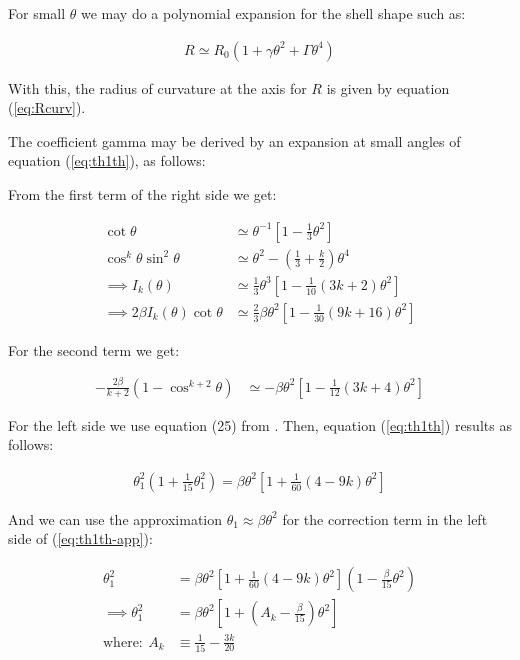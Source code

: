 For small $\theta$ we may do a polynomial expansion for the shell shape such as:

\begin{align}
R \simeq R_0\left(1+\gamma\theta^2 + \Gamma\theta^4\right) \label{eq:R-exp}
\end{align}

With this, the radius of curvature at the axis for $R$ is given by equation (\ref{eq:Rcurv}).

The coefficient gamma may be derived by an expansion at small angles of equation
(\ref{eq:th1th}), as follows:

From the first term of the right side we get:

\begin{align}
\cot\theta &\simeq \theta^{-1}\left[1-\frac{1}{3}\theta^2\right] \\
\cos^k\theta\sin^2\theta &\simeq \theta^2 - \left(\frac{1}{3} + \frac{k}{2}\right)\theta^4 \\
\implies I_k(\theta) &\simeq \frac{1}{3}\theta^3\left[ 1 - \frac{1}{10}(3k+2)\theta^2\right]\\
\implies 2\beta I_k(\theta)\cot\theta &\simeq \frac{2}{3}\beta\theta^2\left[1-\frac{1}{30}
(9k+16)\theta^2\right]\label{eq:AR1} 
\end{align}

For the second term we get:

\begin{align}
-\frac{2\beta}{k+2}\left(1-\cos^{k+2}\theta\right) & \simeq -\beta\theta^2\left[1-\frac{1}{12}
(3k+4)\theta^2\right] \label{eq:AR2}
\end{align}

For the left side we use equation (25) from \CRW{}. Then, equation (\ref{eq:th1th}) results
as follows:

\begin{align}
\theta_1^2\left(1+\frac{1}{15}\theta_1^2\right) = \beta\theta^2\left[1+\frac{1}{60}(4-9k)
\theta^2\right] \label{eq:th1th-app}
\end{align}

And we can use the approximation $\theta_1 \approx \beta\theta^2$ for the correction term in
the left side of (\ref{eq:th1th-app}):

\begin{align}
\theta_1^2 &= \beta\theta^2\left[1+\frac{1}{60}(4-9k)\theta^2\right]
\left(1-\frac{\beta}{15}\theta^2\right) \\
\implies \theta_1^2 &= \beta\theta^2\left[1+ \left(A_k-\frac{\beta}{15}\right)\theta^2\right]\\
\mathrm{where:~} A_k &\equiv \frac{1}{15}-\frac{3k}{20}
\end{align}

